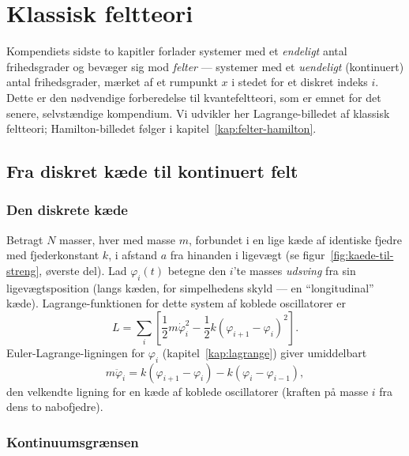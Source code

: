 
\chapter{Klassisk feltteori}
\label{kap:felter}

Kompendiets sidste to kapitler forlader systemer med et \emph{endeligt}
antal frihedsgrader og bevæger sig mod \emph{felter} — systemer med et
\emph{uendeligt} (kontinuert) antal frihedsgrader, mærket af et
rumpunkt $x$ i stedet for et diskret indeks $i$. Dette er den nødvendige
forberedelse til kvantefeltteori, som er emnet for det senere,
selvstændige kompendium. Vi udvikler her Lagrange-billedet af klassisk
feltteori; Hamilton-billedet følger i kapitel~\ref{kap:felter-hamilton}.

\section{Fra diskret kæde til kontinuert felt}

\subsection{Den diskrete kæde}

Betragt $N$ masser, hver med masse $m$, forbundet i en lige kæde af
identiske fjedre med fjederkonstant $k$, i afstand $a$ fra hinanden i
ligevægt (se figur~\ref{fig:kaede-til-streng}, øverste del). Lad
$\varphi_i(t)$ betegne den $i$'te masses \emph{udsving} fra sin
ligevægtsposition (langs kæden, for simpelhedens skyld — en
``longitudinal'' kæde). Lagrange-funktionen for dette system af koblede
oscillatorer er
\begin{equation}
  L = \sum_i\left[\frac12 m\dot\varphi_i^2 - \frac12 k(\varphi_{i+1}-\varphi_i)^2\right].
  \label{eq:L-diskret-kaede}
\end{equation}
Euler-Lagrange-ligningen for $\varphi_i$ (kapitel~\ref{kap:lagrange})
giver umiddelbart
\begin{equation}
  m\ddot\varphi_i = k(\varphi_{i+1}-\varphi_i) - k(\varphi_i-\varphi_{i-1}),
  \label{eq:kaede-bevaegelse}
\end{equation}
den velkendte ligning for en kæde af koblede oscillatorer (kraften på
masse $i$ fra dens to nabofjedre).

\subsection{Kontinuumsgrænsen}

